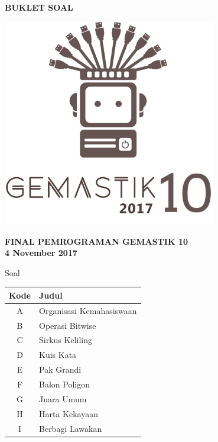 \documentclass[a4paper]{article}
\begin{document}
\begin{titlepage}
\begin{center}

    \textbf{\huge BUKLET SOAL}
    
    \vspace{1cm} %
    
    \includegraphics[width=0.7\textwidth]{../gemastiklogo}
    
	\vspace{1cm} %
    
    \textbf{\LARGE FINAL PEMROGRAMAN GEMASTIK 10}\\[0.5cm]
    \textbf{\LARGE 4 November 2017}

	\vfill
	
	{\Large Soal}
	
	\vspace{.2cm}
	
	\def\arraystretch{1.5} %
	\begin{tabular}{|c|l|}
		\hline
		\textbf{Kode} & \textbf{Judul} \\
		\hline
		A & Organisasi Kemahasiswaan \\
		B & Operasi Bitwise \\
		C & Sirkus Keliling \\
		D & Kuis Kata \\
		E & Pak Grandi \\
		F & Balon Poligon \\
		G & Juara Umum \\
		H & Harta Kekayaan \\
		I & Berbagi Lawakan \\
		\hline
	\end{tabular}
	
\end{center}
\end{titlepage}


\pagebreak

\pagebreak

\pagebreak

\pagebreak

\pagebreak

\pagebreak

\pagebreak

\pagebreak

\end{document}
